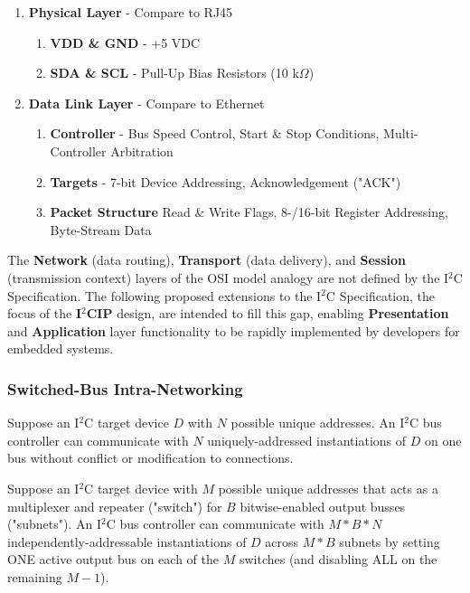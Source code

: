 \documentclass{../tex/report}
\begin{document}
\begin{enumerate}[label=SC\arabic*., ref=SC\arabic*]
    \item\label{sc:1} \textbf{Physical Layer} - Compare to RJ45
    \begin{enumerate}[ref=SC1\alph*]
        \item\label{sc:1a} \textbf{VDD \& GND} - +5 VDC
        \item\label{sc:1b} \textbf{SDA \& SCL} - Pull-Up Bias Resistors (10 k$\Omega$)
    \end{enumerate}
    \item\label{sc:2} \textbf{Data Link Layer} - Compare to Ethernet
    \begin{enumerate}[ref=SC2\alph*]
        \item\label{sc:2a} \textbf{Controller} - Bus Speed Control, Start \& Stop Conditions, Multi-Controller Arbitration
        \item\label{sc:2b} \textbf{Targets} - 7-bit Device Addressing, Acknowledgement ("ACK")
        \item\label{sc:2c} \textbf{Packet Structure} Read \& Write Flags, 8-/16-bit Register Addressing, Byte-Stream Data
    \end{enumerate}
\end{enumerate}

The \textbf{Network} (data routing), \textbf{Transport} (data delivery), and \textbf{Session} (transmission context) layers of the OSI model analogy are not defined by the I${}^2$C Specification. The following proposed extensions to the I${}^2$C Specification, the focus of the \textbf{I${}^2$CIP} design, are intended to fill this gap, enabling \textbf{Presentation} and \textbf{Application} layer functionality to be rapidly implemented by developers for embedded systems.


\subsubsection{Switched-Bus Intra-Networking}

Suppose an I${}^2$C target device $D$ with $N$ possible unique addresses. An I${}^2$C bus controller can communicate with $N$ uniquely-addressed instantiations of $D$ on one bus without conflict or modification to connections.

Suppose an I${}^2$C target device with $M$ possible unique addresses that acts as a multiplexer and repeater ("switch") for $B$ bitwise-enabled output busses ("subnets"). An I${}^2$C bus controller can communicate with $M * B * N$ independently-addressable instantiations of $D$ across $M * B$ subnets by setting ONE active output bus on each of the $M$ switches (and disabling ALL on the remaining $M - 1$).
\end{document}
